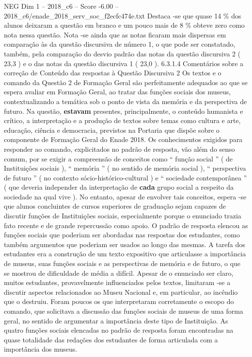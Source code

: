 \begin{textsample}{NEG Dim 1 – 2018\_c6 – Score -6.00 – 2018\_c6/enade\_2018\_serv\_soc\_f2ecfc474e.txt}
Destaca -se que quase 14 \% dos alunos deixaram a questão em branco e um pouco mais de 8 \% obteve zero como nota nessa questão.
Nota -se ainda que as notas ficaram mais dispersas em comparação às da questão discursiva de número 1, o que pode ser constatado, também, pela comparação do desvio padrão das notas da questão discursiva 2 ( 23,3 ) e o das notas da questão discursiva 1 ( 23,0 ). 6.3.1.4 Comentários sobre a correção de Conteúdo das respostas à Questão Discursiva 2 Os textos e o comando da Questão 2 de Formação Geral são perfeitamente adequados ao que se espera avaliar em Formação Geral, ao tratar das funções sociais dos museus, contextualizando a temática sob o ponto de vista da memória e da perspectiva de futuro.
Na questão, \textbf{estavam} presentes, principalmente, o conteúdo humanista e crítico, a interpretação e a produção de textos sobre temas como cultura e arte, educação, ciência e democracia, previstos na Portaria que dispõe sobre o componente de Formação Geral do Enade 2018.
Os conhecimentos exigidos para responder ao comando, explicitados no padrão de resposta, vão além do senso comum, por se exigir a compreensão de conceitos como “ função social ” ( de Instituições sociais ), “ memória ” ( no sentido de memória social ), “ perspectiva de futuro ” ( no contexto sócio-histórico-cultural ) e “ sociedade contemporânea ” ( que deveria independer da interpretação de \textbf{cada} grupo social a respeito da sociedade na qual vive ).
No entanto, apesar de envolver tais conceitos, espera -se que alunos concluintes de cursos superiores de graduação sejam capazes de discutir funções de Instituições sociais, especialmente porque o enunciado trazia fato recente e de grande repercussão como apoio.
O padrão de resposta elencou as funções sociais que poderiam ser abordadas nas respostas dos estudantes, como também argumentos que poderiam ser usados ao longo das mesmas.
A tarefa dos estudantes era a construção de um texto expositivo que articulasse a importância de museus, suas funções sociais e as perspectivas de memória e de futuro, o que se mostrou de dificuldade de média a difícil.
Apesar de o enunciado ser claro, muitos estudantes, provavelmente influenciados pelos textos, limitaram -se a discutir aspectos relacionados ao Museu Nacional e, em particular, ao incêndio que o destruiu.
Foram poucos os que interpretaram corretamente o escopo do comando, que solicitava a discussão das funções sociais de museus de uma forma geral, no sentido de argumentar a importância deste tipo de Instituição.
As quatro funções sociais elencadas no padrão de resposta foram encontradas na quase totalidade das redações dos estudantes de forma articulada com a importância dos museus.

\end{textsample}
